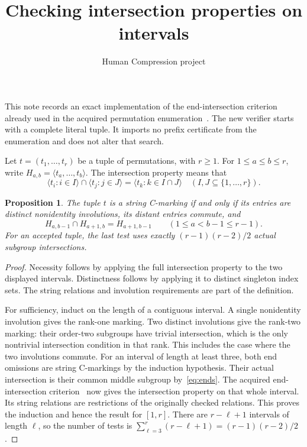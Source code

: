 \documentclass[11pt,a4paper]{article}
\title{Checking intersection properties on intervals}
\author{Human Compression project}\date{}
\newtheorem{proposition}{Proposition}
\begin{document}
\maketitle
This note records an exact implementation of the end-intersection criterion
already used in the acquired permutation enumeration~\cite{method}.
The new verifier starts with a complete literal tuple. It imports no
prefix certificate from the enumeration and does not alter that search.

Let $t=(t_1,\ldots,t_r)$ be a tuple of permutations, with $r\geq1$.
For $1\leq a\leq b\leq r$, write
$H_{a,b}=\langle t_a,\ldots,t_b\rangle$.
The intersection property means that
\[
 \langle t_i:i\in I\rangle\cap\langle t_j:j\in J\rangle
 =\langle t_k:k\in I\cap J\rangle
 \quad(I,J\subseteq\{1,\ldots,r\}).
\]

\begin{proposition}
The tuple $t$ is a string C-marking if and only if its entries are distinct
nonidentity involutions, its distant entries commute, and
\begin{equation}\label{eq:ends}
 H_{a,b-1}\cap H_{a+1,b}=H_{a+1,b-1}
 \qquad(1\leq a<b-1\leq r-1).
\end{equation}
For an accepted tuple, the last test uses exactly
$(r-1)(r-2)/2$ actual subgroup intersections.
\end{proposition}
\begin{proof}
Necessity follows by applying the full intersection property to the two
displayed intervals. Distinctness follows by applying it to distinct
singleton index sets. The string relations and involution requirements
are part of the definition.

For sufficiency, induct on the length of a contiguous interval.
A single nonidentity involution gives the rank-one marking.
Two distinct involutions give the rank-two marking: their order-two
subgroups have trivial intersection, which is the only nontrivial
intersection condition in that rank. This includes the case where the
two involutions commute.
For an interval of length at least three, both end omissions are string
C-markings by the induction hypothesis. Their actual intersection is
their common middle subgroup by~\eqref{eq:ends}.
The acquired end-intersection criterion~\cite[Section~1]{method} now gives
the intersection property on that whole interval. Its string relations
are restrictions of the originally checked relations. This proves the
induction and hence the result for $[1,r]$.
There are $r-\ell+1$ intervals of length $\ell$, so the number of tests is
$\sum_{\ell=3}^r(r-\ell+1)=(r-1)(r-2)/2$.
\end{proof}
\end{document}
